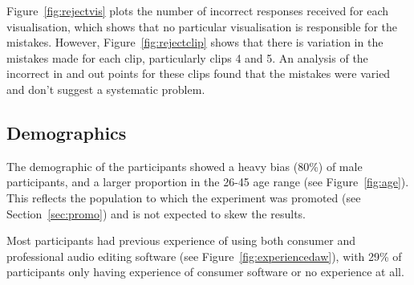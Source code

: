 
Figure~\ref{fig:rejectvis} plots the number of incorrect responses received for each visualisation, which shows that no
particular visualisation is responsible for the mistakes. However, Figure~\ref{fig:rejectclip} shows that there is
variation in the mistakes made for each clip, particularly clips 4 and 5. An analysis of the incorrect in and out
points for these clips found that the mistakes were varied and don't suggest a systematic problem. 


\subsection{Demographics}
The demographic of the participants showed a heavy bias (80\%) of male participants, and a larger proportion in the
26-45 age range (see Figure~\ref{fig:age}). This reflects the population to which the experiment was promoted (see
Section~\ref{sec:promo}) and is not expected to skew the results.


Most participants had previous experience of using both consumer and professional audio editing software (see
Figure~\ref{fig:experiencedaw}), with 29\% of participants only having experience of consumer software or no experience
at all.

